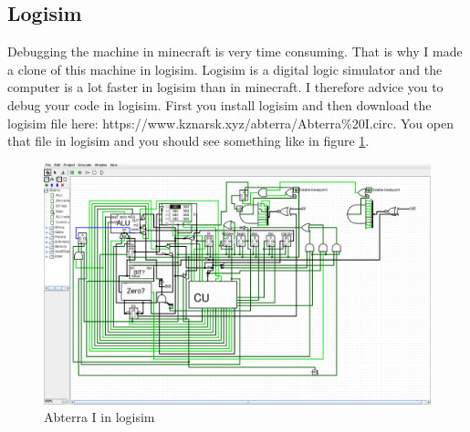 \documentclass{article}
\newcommand{\LogComp}{https://www.kznarsk.xyz/abterra/Abterra\%20I.circ}
\begin{document}
\subsection{Logisim\label{logisim}}
Debugging the machine in minecraft is very time consuming. That is why I made a clone of this machine in logisim. Logisim is a digital logic simulator and the computer is a lot faster in logisim than in minecraft. I therefore advice you to debug your code in logisim. First you install logisim and then download the logisim file here: \LogComp. You open that file in logisim and you should see something like in figure \ref{logisimI}.

\begin{figure}[h]
	\centering
	\includegraphics[width=\textwidth]{Logisim.png}
	\caption{Abterra I in logisim\label{logisimI}}
\end{figure}
~\\
\end{document}
